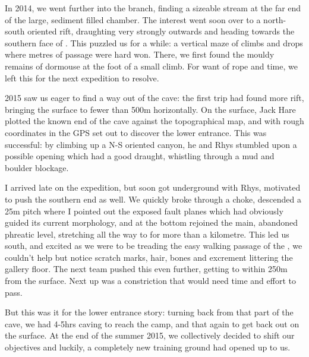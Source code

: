 In 2014, we went further into the  branch, finding a sizeable stream at the far end of the large, sediment filled  chamber. The interest went soon over to a north-south oriented rift, draughting very strongly outwards and heading towards the southern face of . This puzzled us for a while: a vertical maze of climbs and drops where metres of passage were hard won. There, we first found the mouldy remains of dormouse at the foot of a small climb. For want of rope and time, we left this for the next expedition to resolve.

2015 saw us eager to find a way out of the cave: the first trip had found more rift, bringing the surface to fewer than 500m horizontally. On the surface, Jack Hare plotted the known end of the cave against the topographical map, and with rough coordinates in the GPS set out to discover the lower entrance. This was successful: by climbing up a N-S oriented canyon, he and Rhys stumbled upon a possible opening which had a good draught, whistling through a mud and boulder blockage. 

I arrived late on the expedition, but soon got underground with Rhys, motivated to push the southern end as well. We quickly broke through a choke, descended a 25m pitch where I pointed out the exposed fault planes which had obviously guided its current morphology, and at the bottom rejoined the main, abandoned phreatic level, stretching all the way to  for more than a kilometre. This led us south, and excited as we were to be treading the easy walking passage of the , we couldn’t help but notice scratch marks, hair, bones and excrement littering the gallery floor. The next team pushed this even further, getting to within 250m from the surface. Next up was a constriction that would need time and effort to pass.

But this was it for the lower entrance story: turning back from that part of the cave, we had 4-5hrs caving to reach the camp, and that again to get back out on the surface. At the end of the summer 2015, we collectively decided to shift our objectives and luckily, a completely new training ground had opened up to us.

